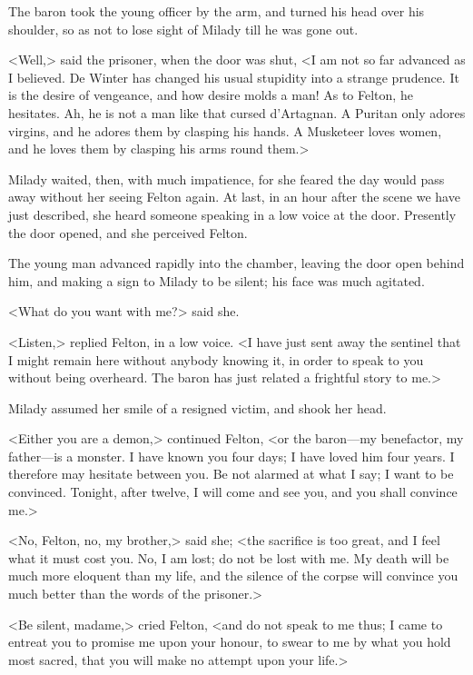 The baron took the young officer by the arm, and turned his head over his shoulder, so as not to lose sight of Milady till he was gone out. 

<Well,> said the prisoner, when the door was shut, <I am not so far advanced as I believed. De Winter has changed his usual stupidity into a strange prudence. It is the desire of vengeance, and how desire molds a man! As to Felton, he hesitates. Ah, he is not a man like that cursed d'Artagnan. A Puritan only adores virgins, and he adores them by clasping his hands. A Musketeer loves women, and he loves them by clasping his arms round them.> 

Milady waited, then, with much impatience, for she feared the day would pass away without her seeing Felton again. At last, in an hour after the scene we have just described, she heard someone speaking in a low voice at the door. Presently the door opened, and she perceived Felton. 

The young man advanced rapidly into the chamber, leaving the door open behind him, and making a sign to Milady to be silent; his face was much agitated. 

<What do you want with me?> said she. 

<Listen,> replied Felton, in a low voice. <I have just sent away the sentinel that I might remain here without anybody knowing it, in order to speak to you without being overheard. The baron has just related a frightful story to me.> 

Milady assumed her smile of a resigned victim, and shook her head. 

<Either you are a demon,> continued Felton, <or the baron---my benefactor, my father---is a monster. I have known you four days; I have loved him four years. I therefore may hesitate between you. Be not alarmed at what I say; I want to be convinced. Tonight, after twelve, I will come and see you, and you shall convince me.> 

<No, Felton, no, my brother,> said she; <the sacrifice is too great, and I feel what it must cost you. No, I am lost; do not be lost with me. My death will be much more eloquent than my life, and the silence of the corpse will convince you much better than the words of the prisoner.> 

<Be silent, madame,> cried Felton, <and do not speak to me thus; I came to entreat you to promise me upon your honour, to swear to me by what you hold most sacred, that you will make no attempt upon your life.> 

